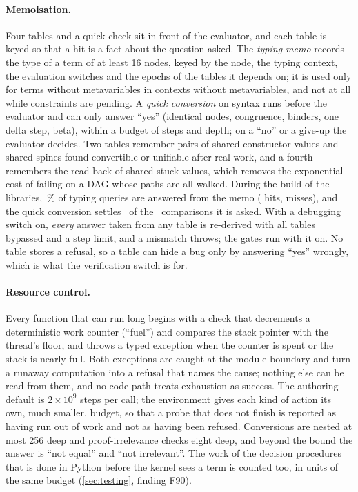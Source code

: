 \paragraph{Memoisation.}
Four tables and a quick check sit in front of the evaluator, and each table is keyed so that a hit is a fact about the question asked.
The \emph{typing memo} records the type of a term of at least 16 nodes, keyed by the node, the typing context, the evaluation switches and the epochs of the tables it depends on; it is used only for terms without metavariables in contexts without metavariables, and not at all while constraints are pending.
A \emph{quick conversion} on syntax runs before the evaluator and can only answer ``yes'' (identical nodes, congruence, binders, one delta step, beta), within a budget of steps and depth; on a ``no'' or a give-up the evaluator decides.
Two tables remember pairs of shared constructor values and shared spines found convertible or unifiable after real work, and a fourth remembers the read-back of shared stuck values, which removes the exponential cost of failing on a DAG whose paths are all walked.
During the build of the libraries, \memoShare\,\% of typing queries are answered from the memo (\memoHits{} hits, \memoMisses{} misses), and the quick conversion settles \synSettled\ of the \synTried\ comparisons it is asked.
With a debugging switch on, \emph{every} answer taken from any table is re-derived with all tables bypassed and a step limit, and a mismatch throws; the gates run with it on.
No table stores a refusal, so a table can hide a bug only by answering ``yes'' wrongly, which is what the verification switch is for.

\paragraph{Resource control.}
Every function that can run long begins with a check that decrements a deterministic work counter (``fuel'') and compares the stack pointer with the thread's floor, and throws a typed exception when the counter is spent or the stack is nearly full.
Both exceptions are caught at the module boundary and turn a runaway computation into a refusal that names the cause; nothing else can be read from them, and no code path treats exhaustion as success.
The authoring default is $2\times10^9$ steps per call; the environment gives each kind of action its own, much smaller, budget, so that a probe that does not finish is reported as having run out of work and not as having been refused.
Conversions are nested at most 256 deep and proof-irrelevance checks eight deep, and beyond the bound the answer is ``not equal'' and ``not irrelevant''.
The work of the decision procedures that is done in Python before the kernel sees a term is counted too, in units of the same budget (\cref{sec:testing}, finding F90).


